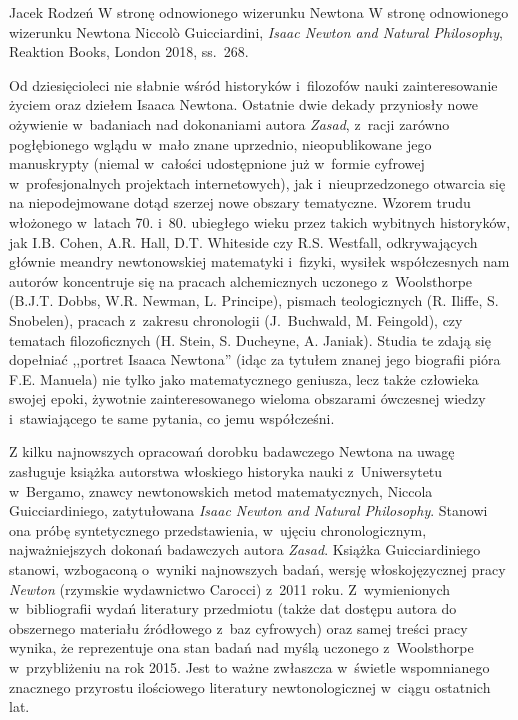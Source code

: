 \begin{recplenv}{Jacek Rodzeń}
	{W stronę odnowionego wizerunku Newtona}
	{W stronę odnowionego wizerunku Newtona}
	{Niccolò Guicciardini, \textit{Isaac Newton and Natural Philosophy}, Reaktion Books, London 2018, ss.~268.}
		




Od dziesięcioleci nie słabnie wśród historyków i~filozofów nauki zainteresowanie życiem oraz dziełem Isaaca Newtona.
Ostatnie dwie dekady przyniosły nowe ożywienie w~badaniach nad dokonaniami autora \textit{Zasad}, z~racji zarówno
pogłębionego wglądu w~mało znane uprzednio, nieopublikowane jego manuskrypty (niemal w~całości udostępnione już w~formie
cyfrowej w~profesjonalnych projektach internetowych), jak i~nieuprzedzonego otwarcia się na niepodejmowane dotąd
szerzej nowe obszary tematyczne. Wzorem trudu włożonego w~latach 70. i~80. ubiegłego wieku przez takich wybitnych
historyków, jak I.B. Cohen, A.R. Hall, D.T. Whiteside czy R.S. Westfall, odkrywających głównie meandry newtonowskiej
matematyki i~fizyki, wysiłek współczesnych nam autorów koncentruje się na pracach alchemicznych uczonego z~Woolsthorpe
(B.J.T. Dobbs, W.R. Newman, L. Principe), pismach teologicznych (R. Iliffe, S. Snobelen), pracach z~zakresu chronologii
(J.~Buchwald, M. Feingold), czy tematach filozoficznych (H. Stein, S. Ducheyne, A. Janiak). Studia te zdają się
dopełniać ,,portret Isaaca Newtona'' (idąc za tytułem znanej jego biografii pióra F.E. Manuela) nie tylko jako
matematycznego geniusza, lecz także człowieka swojej epoki, żywotnie zainteresowanego wieloma obszarami ówczesnej
wiedzy i~stawiającego te same pytania, co jemu współcześni.

Z kilku najnowszych opracowań dorobku badawczego Newtona na uwagę zasługuje książka autorstwa włoskiego historyka
nauki z~Uniwersytetu w~Bergamo, znawcy newtonowskich metod matematycznych, Niccola Guicciardiniego, zatytułowana
\textit{Isaac Newton and Natural Philosophy}. Stanowi ona próbę syntetycznego przedstawienia, w~ujęciu chronologicznym,
najważniejszych dokonań badawczych autora \textit{Zasad}. Książka Guicciardiniego stanowi, wzbogaconą o~wyniki
najnowszych badań, wersję włoskojęzycznej pracy \textit{Newton} (rzymskie wydawnictwo Carocci) z~2011
roku. Z~wymienionych w~bibliografii wydań literatury przedmiotu (także dat dostępu autora do obszernego materiału
źródłowego z~baz cyfrowych) oraz samej treści pracy wynika, że reprezentuje ona stan badań nad myślą
uczonego z~Woolsthorpe w~przybliżeniu na rok 2015. Jest to ważne zwłaszcza w~świetle wspomnianego
znacznego przyrostu ilościowego literatury
newtonologicznej w~ciągu ostatnich lat. 


\end{recplenv}
